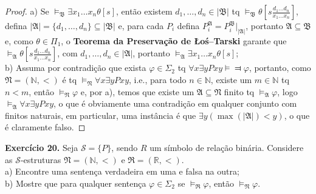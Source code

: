 \documentclass[11pt]{article}
\newcommand{\mc}[1]{\mathcal{#1}}
\newcommand{\mf}[1]{\mathfrak{#1}}
\newcommand{\mbb}[1]{\mathbb{#1}}
\begin{document}
\begin{proof}
    a) Se $\vDash_\mf{B}\exists x_1\dots x_n\theta[s]$, então existem $d_1,\dots,d_n\in|\mf{B}|$ tq $\vDash_\mf{B}\theta\left[s\tfrac{d_1\dots d_n}{x_1\dots x_n}\right]$, defina $|\mf{A}|=\{d_1,\dots,d_n\}\subseteq|\mf{B}|$ e, para cada $P_i$ defina $P_i^\mf{A}=P_i^\mf{B}\vert_{|\mf{A}|}$, portanto $\mf{A}\subseteq\mf{B}$ e, como $\theta\in\Pi_1$, o \textbf{Teorema da Preservação de Łoś–Tarski} garante que $\vDash_\mf{A}\theta\left[s\tfrac{d_1\dots d_n}{x_1\dots x_n}\right]$, com $d_1,\dots,d_n\in|\mf{A}|$, portanto $\vDash_\mf{A}\exists x_1\dots x_n\theta[s]$;\\
    b) Assuma por contradição que exista $\varphi\in\Sigma_2$ tq $\forall x\exists yPxy\vDash\Dashv\varphi$, portanto, como $\mf{N}=(\mbb{N},<)$ é tq $\vDash_\mf{N}\forall x\exists yPxy$, i.e., para todo $n\in\mbb{N}$, existe um $m\in\mbb{N}$ tq $n<m$, então $\vDash_\mf{N}\varphi$ e, por a), temos que existe um $\mf{A}\subseteq\mf{N}$ finito tq $\vDash_\mf{A}\varphi$, logo $\vDash_\mf{A}\forall x\exists yPxy$, o que é obviamente uma contradição em qualquer conjunto com finitos naturais, em particular, uma instância é que $\exists y(\max(|\mf{A}|)<y)$, o que é claramente falso.
\end{proof}

\begin{shaded}
\textbf{Exercício 20.} Seja $\mc{S}=\{P\}$, sendo $R$ um símbolo de relação binária. Considere as $\mc{S}$-estruturas $\mf{N}=(\mbb{N},<)$ e $\mf{R}=(\mbb{R},<)$.\\
a) Encontre uma sentença verdadeira em uma e falsa na outra;\\
b) Mostre que para qualquer sentença $\varphi\in\Sigma_2$ se $\vDash_\mf{R}\varphi$, então $\vDash_\mf{N}\varphi$.
\end{shaded}
\end{document}
